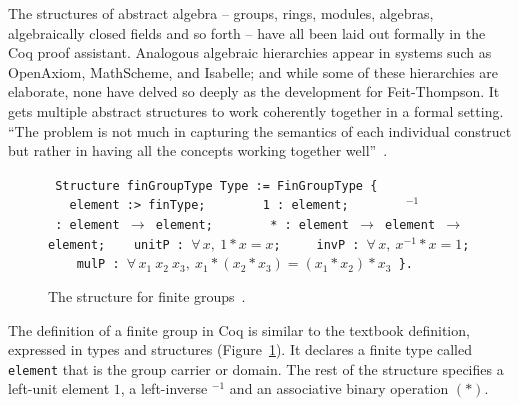 \documentclass{llncs}
\begin{document}
The structures of abstract algebra -- groups, rings, modules,
algebras, algebraically closed fields and so forth -- have all been
laid out formally in the Coq proof assistant.  Analogous algebraic
hierarchies appear in systems such as OpenAxiom, MathScheme, and
Isabelle; and while some of these hierarchies are elaborate, none have
delved so deeply as the development for Feit-Thompson.
It gets multiple abstract structures to work coherently
together in a formal setting. ``The problem is not much in capturing
the semantics of each individual construct but rather in having all
the concepts working together well''~\cite{gonMF}. %
%
%


\begin{figure}
{

\obeylines\tt
Structure~finGroupType~Type~:= FinGroupType \{
~~~element~:>~finType;
~~~~~~~1~:~element;
~~~~~~\hskip0.8mm ${}^{-1}$~:~element $\to$ element;
~~~~~~~*~:~element $\to$ element $\to$ element;
~~~unitP~:~$\forall\,x,~1*x = x$;
~~~~invP~:~$\forall\,x,~x^{-1} * x = 1$;
~~~~mulP~:~$\forall\,x_1~x_2~x_3,~ x_1 * (x_2 * x_3) = (x_1 * x_2) * x_3$
\}.

}
\caption{The structure for finite groups~\cite{gonMF}.}
\label{fig:group}
\end{figure}

The definition of a finite group in Coq is similar to the textbook definition,
expressed in types and structures (Figure~\ref{fig:group}).
It declares a finite type called {\tt element} that is the group
carrier or domain.  The rest of the structure specifies a left-unit
element $1$, a left-inverse ${}^{-1}$ and an associative binary
operation $( * )$.  
\end{document}
